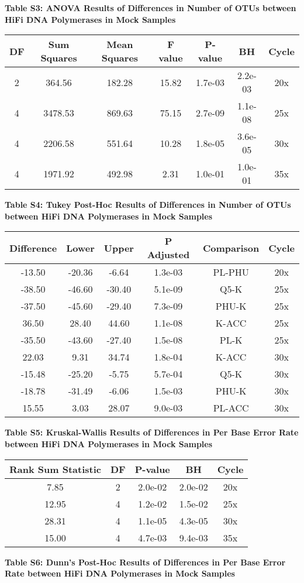 \documentclass[12pt,]{article}
\begin{document}
\newpage

\textbf{Table S3: ANOVA Results of Differences in Number of OTUs between
HiFi DNA Polymerases in Mock Samples}

\begin{longtable}[]{@{}ccccccc@{}}
\toprule
DF & Sum Squares & Mean Squares & F value & P-value & BH &
Cycle\tabularnewline
\midrule
\endhead
2 & 364.56 & 182.28 & 15.82 & 1.7e-03 & 2.2e-03 & 20x\tabularnewline
4 & 3478.53 & 869.63 & 75.15 & 2.7e-09 & 1.1e-08 & 25x\tabularnewline
4 & 2206.58 & 551.64 & 10.28 & 1.8e-05 & 3.6e-05 & 30x\tabularnewline
4 & 1971.92 & 492.98 & 2.31 & 1.0e-01 & 1.0e-01 & 35x\tabularnewline
\bottomrule
\end{longtable}

\newpage

\textbf{Table S4: Tukey Post-Hoc Results of Differences in Number of
OTUs between HiFi DNA Polymerases in Mock Samples}

\begin{longtable}[]{@{}cccccc@{}}
\toprule
Difference & Lower & Upper & P Adjusted & Comparison &
Cycle\tabularnewline
\midrule
\endhead
-13.50 & -20.36 & -6.64 & 1.3e-03 & PL-PHU & 20x\tabularnewline
-38.50 & -46.60 & -30.40 & 5.1e-09 & Q5-K & 25x\tabularnewline
-37.50 & -45.60 & -29.40 & 7.3e-09 & PHU-K & 25x\tabularnewline
36.50 & 28.40 & 44.60 & 1.1e-08 & K-ACC & 25x\tabularnewline
-35.50 & -43.60 & -27.40 & 1.5e-08 & PL-K & 25x\tabularnewline
22.03 & 9.31 & 34.74 & 1.8e-04 & K-ACC & 30x\tabularnewline
-15.48 & -25.20 & -5.75 & 5.7e-04 & Q5-K & 30x\tabularnewline
-18.78 & -31.49 & -6.06 & 1.5e-03 & PHU-K & 30x\tabularnewline
15.55 & 3.03 & 28.07 & 9.0e-03 & PL-ACC & 30x\tabularnewline
\bottomrule
\end{longtable}

\newpage

\textbf{Table S5: Kruskal-Wallis Results of Differences in Per Base
Error Rate between HiFi DNA Polymerases in Mock Samples}

\begin{longtable}[]{@{}ccccc@{}}
\toprule
Rank Sum Statistic & DF & P-value & BH & Cycle\tabularnewline
\midrule
\endhead
7.85 & 2 & 2.0e-02 & 2.0e-02 & 20x\tabularnewline
12.95 & 4 & 1.2e-02 & 1.5e-02 & 25x\tabularnewline
28.31 & 4 & 1.1e-05 & 4.3e-05 & 30x\tabularnewline
15.00 & 4 & 4.7e-03 & 9.4e-03 & 35x\tabularnewline
\bottomrule
\end{longtable}

\newpage

\textbf{Table S6: Dunn's Post-Hoc Results of Differences in Per Base
Error Rate between HiFi DNA Polymerases in Mock Samples}
\end{document}
